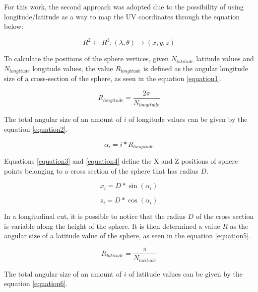 \documentclass[runningheads]{llncs}
\begin{document}
For this work, the second approach was adopted due to the possibility of using longitude/latitude as a way to map the UV coordinates through the equation below:

\begin{equation}
R^2 \leftarrow R^3 : (\lambda, \theta) \rightarrow (x, y, z)
\label{equation1}
\end{equation}

To calculate the positions of the sphere vertices, given $N_{latitude}$ latitude values  and $N_{longitude}$ longitude values, the value $R_{longitude}$ is defined as the angular longitude size of a cross-section of the sphere, as seen in the equation \ref{equation1}.

\begin{equation}
R_{longitude} = \frac{2 \pi}{N_{longitude}}
\label{equation1}
\end{equation}

The total angular size of an amount of $i$ of longitude values can be given by the equation \ref{equation2}.

\begin{equation}
\alpha_{i} = i * R_{longitude}
\label{equation2}
\end{equation}

Equations \ref{equation3} and \ref{equation4} define the X and Z positions of sphere points belonging to a cross section of the sphere that has radius $D$.

\begin{equation}
x_{i} = D * \sin(\alpha_{i})
\label{equation3}
\end{equation}

\begin{equation}
z_{i} = D * \cos(\alpha_{i})
\label{equation4}
\end{equation}

In a longitudinal cut, it is possible to notice that the radius $D$ of the cross section is variable along the height of the sphere. It is then determined a value $R$ as the angular size of a latitude value of the sphere, as seen in the equation \ref{equation5}.

\begin{equation}
R_{latitude} = \frac{\pi}{ N_{latitude}}
\label{equation5}
\end{equation}

The total angular size of an amount of $i$ of latitude values can be given by the equation \ref{equation6}.
\end{document}
